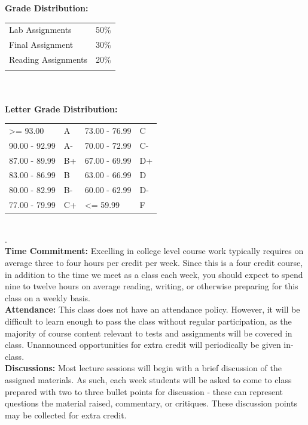 \documentclass[11pt]{article}
\begin{document}
\textbf {\large Grade Distribution:} \\
\hspace*{40mm}
\begin{tabular}{ l l }
Lab Assignments & 50\% \\
Final Assignment & 30\%\\
Reading Assignments & 20\%\\ \\
\end{tabular} \\\\

\textbf {\large Letter Grade Distribution:} \\
\hspace*{40mm}
\begin{tabular}{ l l | l l }
\textgreater= 93.00 & A & 73.00 - 76.99 & C \\
90.00 - 92.99 & A-  & 70.00 - 72.99 & C- \\
87.00 - 89.99 & B+  & 67.00 - 69.99 & D+ \\
83.00 - 86.99 & B  & 63.00 - 66.99 & D \\
80.00 - 82.99 & B-  & 60.00 - 62.99 & D- \\
77.00 - 79.99 & C+  & \textless= 59.99 & F \\
\end{tabular} \\
.\\
\textbf {\large Time Commitment:} Excelling in college level course work typically requires on average three to four hours per credit per week.  Since this is a four credit course, in addition to the time we meet as a class each week, you should expect to spend nine to twelve hours on average reading, writing, or otherwise preparing for this class on a weekly basis.\\

\textbf {\large Attendance:} This class does not have an attendance policy.  However, it will be difficult to learn enough to pass the class without regular participation, as the majority of course content relevant to tests and assignments will be covered in class.  Unannounced opportunities for extra credit will periodically be given in-class.\\

\textbf {\large Discussions:} Most lecture sessions will begin with a brief discussion of the assigned materials.  As such, each week students will be asked to come to class prepared with two to three bullet points for discussion - these can represent questions the material raised, commentary, or critiques.  These discussion points may be collected for extra credit.\\
\end{document}
